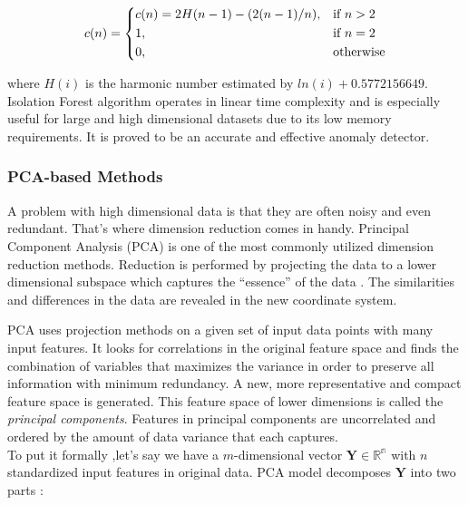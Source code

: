  \[
 c(n) = 
  \begin{dcases}
     c(n) = 2H(n - 1) - (2(n - 1) / n), & \text{if } n > 2\\
     1, & \text{if } n = 2\\
     0, & \text{otherwise}
 \end{dcases} 
 \]
 
 where $H(i)$ is the harmonic number estimated by $ln(i) + 0.5772156649$. \\
 
 Isolation Forest algorithm operates in linear time complexity and is especially useful for large and high dimensional datasets due to its low memory requirements. It is proved to be an accurate and effective anomaly detector.
 
 
 \subsubsection{PCA-based Methods}
 A problem with high dimensional data is that they are often noisy and even redundant. That's where dimension reduction comes in handy. Principal Component Analysis (PCA) is one of the most commonly utilized dimension reduction methods. Reduction is performed by projecting the data to a lower dimensional subspace which captures the “essence” of the data \cite{murphy2013machine}. The similarities and differences in the data are revealed in the new coordinate system. 
 
 PCA uses projection methods on a given set of input data points with many input features. It looks for correlations in the original feature space and finds the combination of variables that maximizes the variance in order to preserve all information with minimum redundancy. A new, more representative and compact feature space is generated. This feature space of lower dimensions is called the \textit{principal components}. Features in principal components are uncorrelated and ordered by the amount of data variance that each captures.\\
 
 To put it formally ,let's say we have a $m$-dimensional vector $\mathbf{Y} \in \mathbb{R^n}$ with $n$ standardized input features in original data. PCA model decomposes $\mathbf{Y}$ into two parts \cite{pca1997}: 
 
